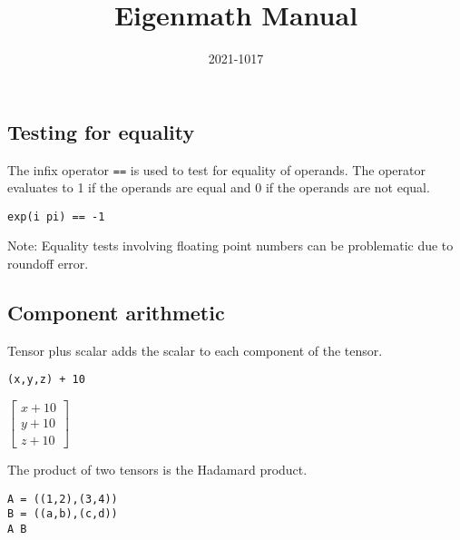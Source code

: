 \documentclass[12pt]{article}
\title{Eigenmath Manual}
\date{2021-1017}
\author{}
\begin{document}
\maketitle

\tableofcontents

\newpage





\subsection{Testing for equality}
The infix operator \verb$==$ is used to test for equality of operands.
The operator evaluates to 1 if the operands are equal and 0 if the operands are not equal.

\begin{Verbatim}[formatcom=\color{blue}]
exp(i pi) == -1
\end{Verbatim}


\bigskip
\noindent
Note: Equality tests involving floating point numbers
can be problematic due to roundoff error.











\subsection{Component arithmetic}

\noindent
Tensor plus scalar adds the scalar to each component of the tensor.

{\color{blue}\begin{verbatim}
(x,y,z) + 10
\end{verbatim}}

\noindent
$\begin{bmatrix}x+10\\y+10\\z+10\end{bmatrix}$

\bigskip
\noindent
The product of two tensors is the Hadamard product.

{\color{blue}\begin{verbatim}
A = ((1,2),(3,4))
B = ((a,b),(c,d))
A B
\end{verbatim}}
\end{document}
